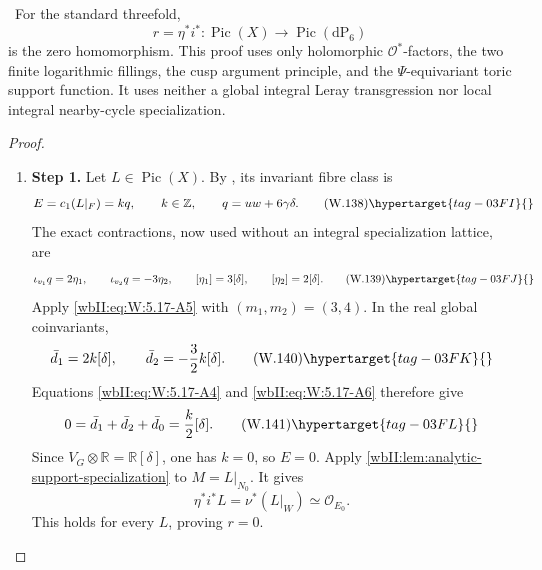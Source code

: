 \begin{theorem}
\hypertarget{tag-03IW}{}\label{wbII:thm:analytic-all-picard}

\ For the standard threefold,
\[
 r=\eta^*i^*:\operatorname{Pic}(X)\longrightarrow
 \operatorname{Pic}(\mathrm{dP}_6)
\]
is the zero homomorphism.  This proof uses only holomorphic
\(\mathcal O^*\)-factors, the two finite logarithmic fillings, the cusp
argument principle, and the \(\Psi\)-equivariant toric support function.
It uses neither a global integral Leray transgression nor local integral
nearby-cycle specialization.
\end{theorem}



\begin{proof}
\begin{enumerate}[label={$\langle1\rangle$\arabic*.},leftmargin=*]
\item 
\noindent\textbf{Step 1.} Let \(L\in\operatorname{Pic}(X)\).  By
, its invariant fibre class is
\[
 E=c_1(L|_F)=kq,
 \qquad k\in\mathbb Z,
 \qquad q=uw+6\gamma\delta.
\tag{W.138}\hypertarget{tag-03FI}{}\label{wbII:eq:W:5.17-A35}
\]
The exact contractions, now used without an integral specialization
lattice, are
\[
 \iota_{v_1}q=2\eta_1,
 \qquad
 \iota_{v_2}q=-3\eta_2,
 \qquad
 [\eta_1]=3[\delta],
 \qquad
 [\eta_2]=2[\delta].
\tag{W.139}\hypertarget{tag-03FJ}{}\label{wbII:eq:W:5.17-A36}
\]
Apply \eqref{wbII:eq:W:5.17-A5} with \((m_1,m_2)=(3,4)\).  In the real global
coinvariants,
\[
 \bar d_1=2k[\delta],
 \qquad
 \bar d_2=-\frac32k[\delta].
\tag{W.140}\hypertarget{tag-03FK}{}\label{wbII:eq:W:5.17-A37}
\]
Equations \eqref{wbII:eq:W:5.17-A4} and \eqref{wbII:eq:W:5.17-A6} therefore give
\[
 0=\bar d_1+\bar d_2+\bar d_0
   =\frac{k}{2}[\delta].
\tag{W.141}\hypertarget{tag-03FL}{}\label{wbII:eq:W:5.17-A38}
\]
Since \(V_G\otimes\mathbb R=\mathbb R[\delta]\), one has \(k=0\), so
\(E=0\).  Apply \cref{wbII:lem:analytic-support-specialization} to
\(M=L|_{N_0}\).  It gives
\[
 \eta^*i^*L=\nu^*(L|_W)\simeq\mathcal O_{E_0}.
\]
This holds for every \(L\), proving \(r=0\).

\end{enumerate}
\end{proof}

